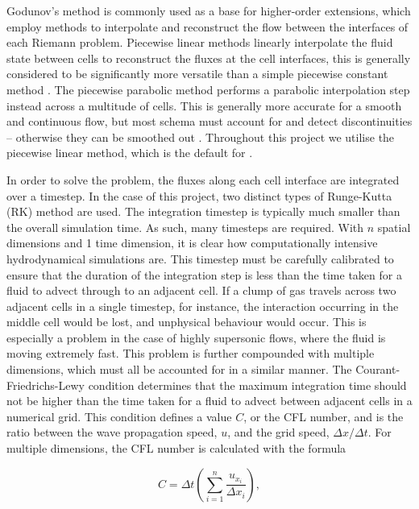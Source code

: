 Godunov's method is commonly used as a base for higher-order extensions, which employ methods to interpolate and reconstruct the flow between the interfaces of each Riemann problem.
Piecewise linear methods linearly interpolate the fluid state between cells to reconstruct the fluxes at the cell interfaces, this is generally considered to be significantly more versatile than a simple piecewise constant method \parencite{vanleerUltimateConservativeDifference1979}.
The piecewise parabolic method performs a parabolic interpolation step instead across a multitude of cells.
This is generally more accurate for a smooth and continuous flow, but most schema must account for and detect discontinuities -- otherwise they can be smoothed out
\parencite{colella_piecewise_1984}.
Throughout this project we utilise the piecewise linear method, which is the default for \athena{}.

In order to solve the problem, the fluxes along each cell interface are integrated over a timestep.
In the case of this project, two distinct types of Runge-Kutta (RK) method are used.
The integration timestep is typically much smaller than the overall simulation time.
As such, many timesteps are required.
With $n$ spatial dimensions and 1 time dimension, it is clear how computationally intensive hydrodynamical simulations are.
This timestep must be carefully calibrated to ensure that the duration of the integration step is less than the time taken for a fluid to advect through to an adjacent cell.
If a clump of gas travels across two adjacent cells in a single timestep, for instance, the interaction occurring in the middle cell would be lost, and unphysical behaviour would occur.
This is especially a problem in the case of highly supersonic flows, where the fluid is moving extremely fast.
This problem is further compounded with multiple dimensions, which must all be accounted for in a similar manner.
The Courant-Friedrichs-Lewy condition determines that the maximum integration time should not be higher than the time taken for a fluid to advect between adjacent cells in a numerical grid.
This condition defines a value $C$, or the CFL number, and is the ratio between the wave propagation speed, $u$, and the grid speed, $\Delta x / \Delta t$.
For multiple dimensions, the CFL number is calculated with the formula

\begin{equation}
  \label{eq:cfl}
  C = \Delta t \left(\sum^n_{i=1} \frac{u_{x_i}}{\Delta x_i}\right) ,
\end{equation}

